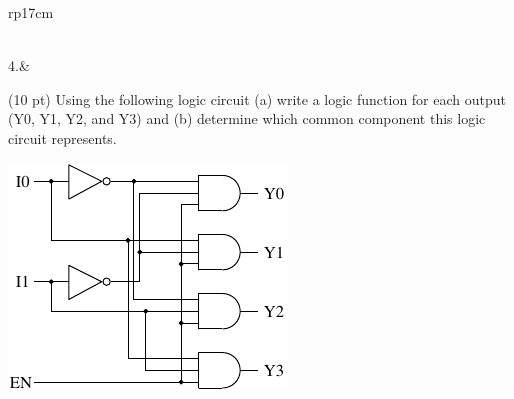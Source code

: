 \documentclass{article}
\begin{document}
\begin{longtable}[l]{rp{17cm}}
\begin{minipage}[t]{\linewidth}
\vspace{6cm
}
\end{minipage}\\
\medskip
4.&\begin{minipage}[t]{\linewidth}(10 pt) Using the following logic circuit (a) write a logic function for each output (Y0, Y1, Y2, and Y3) and (b) determine which common component this logic circuit represents.\\
\begin{center}
  \includegraphics{../Decoders/Assessments/2to4BinaryDecoderLogic} \\
\end{center}


\end{minipage}
\end{longtable}
\end{document}
